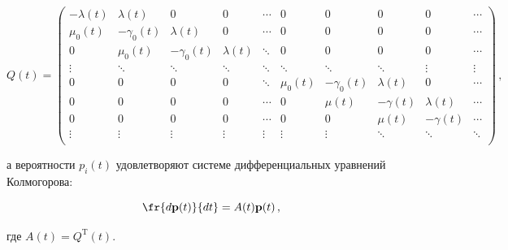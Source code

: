 \begin{small}

\begin{equation*}

Q(t)=\begin{pmatrix}

- \lambda(t)   & \lambda(t)   & 0  & 0   & \cdots  & 0  & 0 & 0 & 0 &  \cdots \\[3pt]

\mu_0(t) & -\gamma_0(t)   & \lambda(t) & 0  & \cdots    &  0 &   0  & 0 & 0 &  \cdots  \\[3pt]

0  & \mu_0(t)    &  -\gamma_0(t)  &  \lambda(t) & \ddots   & 0 &   0  & 0 & 0 &  \cdots  \\[3pt]

\vdots  & \ddots    & \ddots & \ddots  & \ddots    &  \ddots &  \ddots &  \ddots  &  \vdots &  \vdots \\[3pt]

0  & 0    & 0 & 0  & \ddots    &  \mu_0(t) &   -\gamma_0(t) & \lambda(t) & 0 &  \cdots \\[3pt]

0  & 0    & 0 & 0  & \cdots    &  0&   \mu(t) &   -\gamma(t)  & \lambda(t) &  \cdots  \\[3pt]

0  & 0    & 0 & 0  & \cdots    &  0&   0 &   \mu(t)  & -\gamma(t) &  \cdots  \\[3pt]

\vdots  & \vdots     & \vdots   & \vdots    & \vdots    &  \vdots&   \vdots &   \ddots  & \ddots &  \ddots  \\[3pt]

\end{pmatrix}\,,

\end{equation*}

\end{small}



\noindent

а вероятности $p_i(t)$ удовлетворяют системе дифференциальных уравнений Колмогорова:

\begin{equation}

\label{ur01} 

\fr{d {\mathbf{p}}(t)}{dt}=A(t) {\mathbf{p}}(t)\,,

\end{equation}

\noindent где $A(t)=Q^{\mathrm{T}}(t)$.



